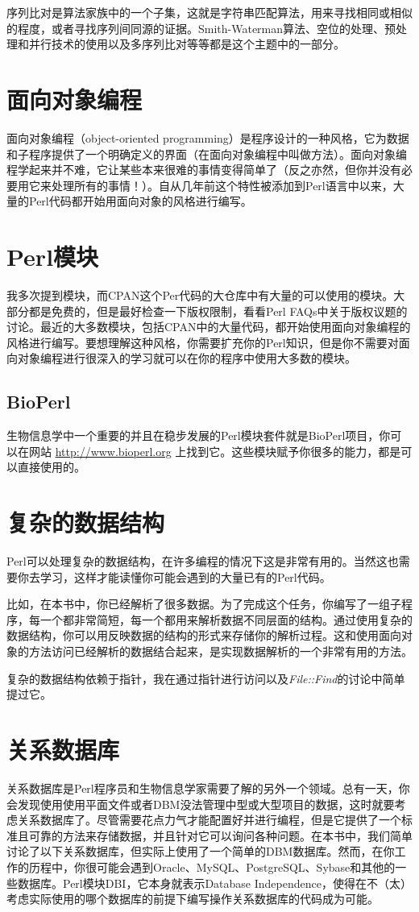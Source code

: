序列比对是算法家族中的一个子集，这就是字符串匹配算法，用来寻找相同或相似的程度，或者寻找序列间同源的证据。Smith-Waterman算法、空位的处理、预处理和并行技术的使用以及多序列比对等等都是这个主题中的一部分。

\section{面向对象编程}
面向对象编程（object-oriented programming）是程序设计的一种风格，它为数据和子程序提供了一个明确定义的界面（在面向对象编程中叫做方法）。面向对象编程学起来并不难，它让某些本来很难的事情变得简单了（反之亦然，但你并没有必要用它来处理所有的事情！）。自从几年前这个特性被添加到Perl语言中以来，大量的Perl代码都开始用面向对象的风格进行编写。

\section{Perl模块}
我多次提到模块，而CPAN这个Per代码的大仓库中有大量的可以使用的模块。大部分都是免费的，但是最好检查一下版权限制，看看Perl FAQs中关于版权议题的讨论。最近的大多数模块，包括CPAN中的大量代码，都开始使用面向对象编程的风格进行编写。要想理解这种风格，你需要扩充你的Perl知识，但是你不需要对面向对象编程进行很深入的学习就可以在你的程序中使用大多数的模块。 

\subsection{BioPerl}
生物信息学中一个重要的并且在稳步发展的Perl模块套件就是BioPerl项目，你可以在网站 \href{http://www.bioperl.org}{http://www.bioperl.org} 上找到它。这些模块赋予你很多的能力，都是可以直接使用的。

\section{复杂的数据结构}
Perl可以处理复杂的数据结构，在许多编程的情况下这是非常有用的。当然这也需要你去学习，这样才能读懂你可能会遇到的大量已有的Perl代码。

比如，在本书中，你已经解析了很多数据。为了完成这个任务，你编写了一组子程序，每一个都非常简短，每一个都用来解析数据不同层面的结构。通过使用复杂的数据结构，你可以用反映数据的结构的形式来存储你的解析过程。这和使用面向对象的方法访问已经解析的数据结合起来，是实现数据解析的一个非常有用的方法。

复杂的数据结构依赖于指针，我在通过指针进行访问以及\textit{File::Find}的讨论中简单提过它。

\section{关系数据库}
关系数据库是Perl程序员和生物信息学家需要了解的另外一个领域。总有一天，你会发现使用使用平面文件或者DBM没法管理中型或大型项目的数据，这时就要考虑关系数据库了。尽管需要花点力气才能配置好并进行编程，但是它提供了一个标准且可靠的方法来存储数据，并且针对它可以询问各种问题。在本书中，我们简单讨论了以下关系数据库，但实际上使用了一个简单的DBM数据库。然而，在你工作的历程中，你很可能会遇到Oracle、MySQL、PostgreSQL、Sybase和其他的一些数据库。Perl模块DBI，它本身就表示Database Independence，使得在不（太）考虑实际使用的哪个数据库的前提下编写操作关系数据库的代码成为可能。

